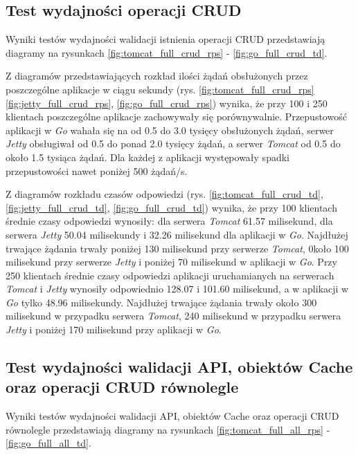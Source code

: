 % 
\clearpage

\subsection{Test wydajności operacji CRUD}

Wyniki testów wydajności walidacji istnienia operacji CRUD przedstawiają diagramy na rysunkach \ref{fig:tomcat_full_crud_rps} - \ref{fig:go_full_crud_td}.

Z diagramów przedstawiających rozkład ilości żądań obsłużonych przez poszczególne aplikacje w ciągu sekundy (rys. \ref{fig:tomcat_full_crud_rps} \ref{fig:jetty_full_crud_rps}, \ref{fig:go_full_crud_rps}) wynika, że przy 100 i 250 klientach poszczególne aplikacje zachowywały się porównywalnie. Przepustowość aplikacji w \textsl{Go} wahała się na od 0.5 do 3.0 tysięcy obsłużonych żądań, serwer \textsl{Jetty} obsługiwał od 0.5 do ponad 2.0 tysięcy żądań, a serwer \textsl{Tomcat} od 0.5 do około 1.5 tysiąca żądań. Dla każdej z aplikacji występowały spadki przepustowości nawet poniżej 500 żądań/s.

Z diagramów rozkładu czasów odpowiedzi (rys. \ref{fig:tomcat_full_crud_td}, \ref{fig:jetty_full_crud_td}, \ref{fig:go_full_crud_td}) wynika, że przy 100 klientach średnie czasy odpowiedzi wynosiły: dla serwera \textsl{Tomcat} 61.57 milisekund, dla serwera \textsl{Jetty} 50.04 milisekundy i 32.26 milisekund dla aplikacji w \textsl{Go}. Najdłużej trwające żądania trwały poniżej 130 milisekund przy serwerze  \textsl{Tomcat}, 0koło 100 milisekund przy serwerze \textsl{Jetty} i poniżej 70 milisekund w aplikacji w \textsl{Go}. Przy 250 klientach średnie czasy odpowiedzi aplikacji uruchamianych na serwerach \textsl{Tomcat} i \textsl{Jetty}  wynosiły odpowiednio 128.07 i 101.60 milisekund, a w aplikacji w \textsl{Go} tylko 48.96 milisekundy. Najdłużej trwające żądania trwały około 300 milisekund w przypadku serwera  \textsl{Tomcat}, 240 milisekund w przypadku serwera \textsl{Jetty} i poniżej 170 milisekund przy aplikacji w \textsl{Go}.


\clearpage

\subsection{Test wydajności walidacji API, obiektów Cache oraz operacji CRUD równolegle }

Wyniki testów wydajności walidacji API, obiektów Cache oraz operacji CRUD równolegle przedstawiają diagramy na rysunkach \ref{fig:tomcat_full_all_rps} - \ref{fig:go_full_all_td}.              

